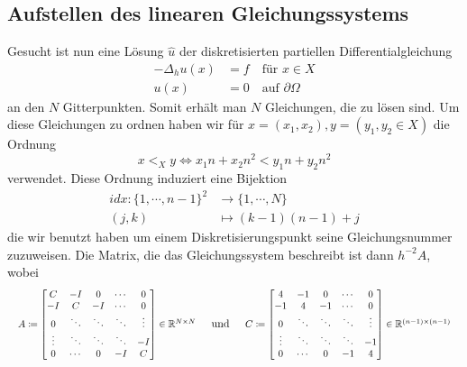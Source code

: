 \documentclass{scrartcl}
\theoremstyle{remark}
\begin{document}
\subsection{Aufstellen des linearen Gleichungssystems}
Gesucht ist nun eine Lösung \(\hat{u}\) der diskretisierten partiellen Differentialgleichung
\begin{align*}
  -\Delta_{h} u(x) &= f \quad \text{für } x \in X   \\
              u(x) &= 0 \quad \text{auf } \partial \Omega
\end{align*}
an den \(N\) Gitterpunkten. Somit erhält man \(N\) Gleichungen, die zu lösen sind. Um diese Gleichungen zu ordnen
haben wir für \(x = (x_{1}, x_{2}), y = (y_{1}, y_{2} \in X)\) die Ordnung
\[x <_{X} y \iff x_{1}n + x_{2}n^{2} < y_{1}n + y_{2}n^{2}\]
verwendet. Diese Ordnung induziert eine Bijektion
\begin{align*}
  idx: \{1, \cdots ,n - 1\}^{2} &\longrightarrow \{1, \cdots ,N \} \\ 
                          (j, k)&\longmapsto (k - 1)(n - 1) + j
\end{align*}
die wir benutzt haben um einem Diskretisierungspunkt seine Gleichungsnummer zuzuweisen. Die Matrix, die das Gleichungssystem beschreibt ist dann
\(h^{-2}A\), wobei
\[
\begin{array}{ccc}
  \scalebox{0.9}{$
  \begin{array}{l}
    A \coloneq \begin{bmatrix}
    C & -I & 0 & \cdots & 0 \\
    -I & C & -I & \cdots & 0 \\
    0 & \ddots & \ddots & \ddots & \vdots \\
    \vdots & \ddots & \ddots & \ddots & -I \\
    0 & \cdots & 0 & -I & C
    \end{bmatrix}
    \in \mathbb{R}^{N \times N}
  \end{array}
  $}
  &
  \text{und}
  &
  \scalebox{0.9}{$
  \begin{array}{l}
    C \coloneq \begin{bmatrix}
    4 & -1 & 0 & \cdots & 0 \\
    -1 & 4 & -1 & \cdots & 0 \\
    0 & \ddots & \ddots & \ddots & \vdots \\
    \vdots & \ddots & \ddots & \ddots & -1 \\
    0 & \cdots & 0 & -1 & 4
    \end{bmatrix}
    \in \mathbb{R}^{(n-1) \times (n-1)}
  \end{array}
  $}
\end{array}
\] \cite{PPI_Poisson} 
\end{document}

